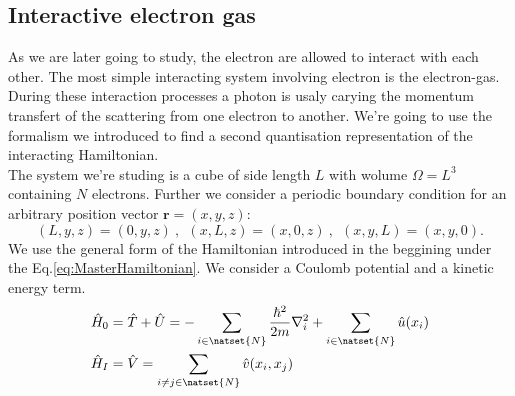 \documentclass[../main.tex]{subfile}
\begin{document}
\subsection{Interactive electron gas}
As we are later going to study, the electron are allowed to interact with each other. The most simple interacting system involving electron is the electron-gas.
During these interaction processes a photon is
usaly carying the momentum transfert of the scattering from one electron to another. We're going to use the formalism we introduced to 
find a second quantisation representation of the interacting Hamiltonian.\\

The system we're studing is a cube of side length $L$ with wolume $\Omega = L^3$ containing $N$ electrons. Further we consider a periodic boundary condition for an arbitrary 
position vector $\bm{r} = (x,y,z)$:
\[
    (L,y,z) = (0,y,z)~,~~(x,L,z) = (x,0,z)~,~~(x,y,L) = (x,y,0).
\]  
We use the general form of the Hamiltonian introduced in the beggining under the Eq.\ref{eq:MasterHamiltonian}. We consider a Coulomb potential and a kinetic energy term.
\begin{align}
    \hat{H}_0 &= \hat{T}+\hat{U} =- \sum_{i\in \natset{N}} \frac{\hbar^2}{2m}\nabla_i^2 + \sum_{i\in \natset{N}} \hat{u}(x_i)\\
    \hat{H}_I &= \hat{V}= \sum_{i\neq j \in \natset{N}} \hat{v}(x_i, x_j)
\end{align} 
\end{document}
